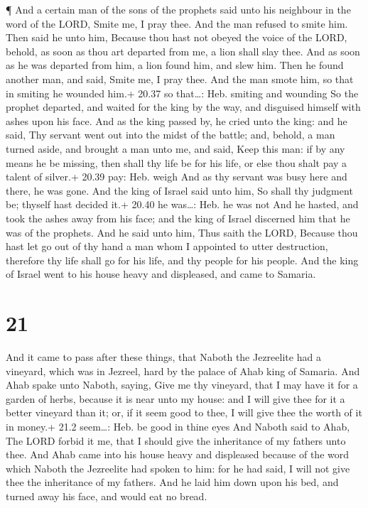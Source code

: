  ¶ And a certain man of the sons of the prophets said unto
his neighbour in the word of the LORD, Smite me, I pray thee. And the
man refused to smite him.  Then said he unto him, Because
thou hast not obeyed the voice of the LORD, behold, as soon as thou art
departed from me, a lion shall slay thee. And as soon as he was departed
from him, a lion found him, and slew him.  Then he found
another man, and said, Smite me, I pray thee. And the man smote him, so
that in smiting he wounded him.+ 20.37 so that\ldots: Heb. smiting and
wounding  So the prophet departed, and waited for the king
by the way, and disguised himself with ashes upon his face.
 And as the king passed by, he cried unto the king: and he
said, Thy servant went out into the midst of the battle; and, behold, a
man turned aside, and brought a man unto me, and said, Keep this man: if
by any means he be missing, then shall thy life be for his life, or else
thou shalt pay a talent of silver.+ 20.39 pay: Heb. weigh 
And as thy servant was busy here and there, he was gone. And the king of
Israel said unto him, So shall thy judgment be; thyself hast decided
it.+ 20.40 he was\ldots: Heb. he was not  And he hasted,
and took the ashes away from his face; and the king of Israel discerned
him that he was of the prophets.  And he said unto him,
Thus saith the LORD, Because thou hast let go out of thy hand a man whom
I appointed to utter destruction, therefore thy life shall go for his
life, and thy people for his people.  And the king of
Israel went to his house heavy and displeased, and came to Samaria.

\hypertarget{section-20}{%
\section{21}\label{section-20}}

 And it came to pass after these things, that Naboth the
Jezreelite had a vineyard, which was in Jezreel, hard by the palace of
Ahab king of Samaria.  And Ahab spake unto Naboth, saying,
Give me thy vineyard, that I may have it for a garden of herbs, because
it is near unto my house: and I will give thee for it a better vineyard
than it; or, if it seem good to thee, I will give thee the worth of it
in money.+ 21.2 seem\ldots: Heb. be good in thine eyes  And
Naboth said to Ahab, The LORD forbid it me, that I should give the
inheritance of my fathers unto thee.  And Ahab came into his
house heavy and displeased because of the word which Naboth the
Jezreelite had spoken to him: for he had said, I will not give thee the
inheritance of my fathers. And he laid him down upon his bed, and turned
away his face, and would eat no bread.

